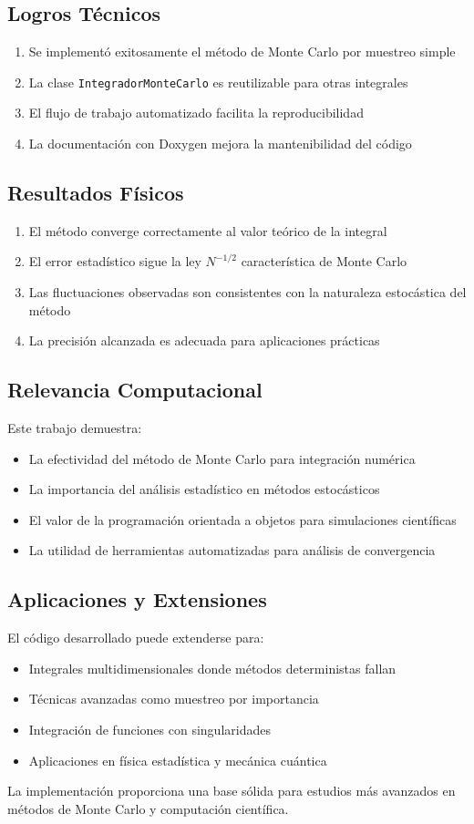\documentclass[11pt,a4paper]{article}
\begin{document}
\subsection{Logros Técnicos}
\begin{enumerate}
    \item Se implementó exitosamente el método de Monte Carlo por muestreo simple
    \item La clase \texttt{IntegradorMonteCarlo} es reutilizable para otras integrales
    \item El flujo de trabajo automatizado facilita la reproducibilidad
    \item La documentación con Doxygen mejora la mantenibilidad del código
\end{enumerate}

\subsection{Resultados Físicos}
\begin{enumerate}
    \item El método converge correctamente al valor teórico de la integral
    \item El error estadístico sigue la ley $N^{-1/2}$ característica de Monte Carlo
    \item Las fluctuaciones observadas son consistentes con la naturaleza estocástica del método
    \item La precisión alcanzada es adecuada para aplicaciones prácticas
\end{enumerate}

\subsection{Relevancia Computacional}
Este trabajo demuestra:
\begin{itemize}
    \item La efectividad del método de Monte Carlo para integración numérica
    \item La importancia del análisis estadístico en métodos estocásticos
    \item El valor de la programación orientada a objetos para simulaciones científicas
    \item La utilidad de herramientas automatizadas para análisis de convergencia
\end{itemize}

\subsection{Aplicaciones y Extensiones}
El código desarrollado puede extenderse para:
\begin{itemize}
    \item Integrales multidimensionales donde métodos deterministas fallan
    \item Técnicas avanzadas como muestreo por importancia
    \item Integración de funciones con singularidades
    \item Aplicaciones en física estadística y mecánica cuántica
\end{itemize}

La implementación proporciona una base sólida para estudios más avanzados en métodos de Monte Carlo y computación científica.
\end{document}
